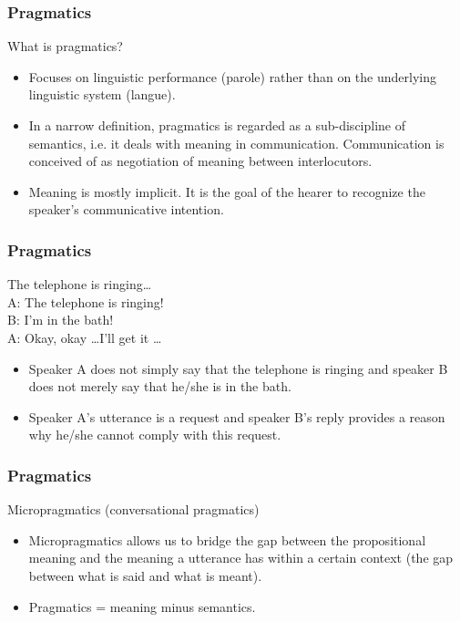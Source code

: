 \documentclass[12pt, table]{beamer}
\begin{document}
\begin{frame}
\frametitle{Pragmatics}
What is pragmatics?
\begin{itemize}
\item Focuses on linguistic performance (parole) rather than on the underlying linguistic system (langue). 
\item In a narrow definition, pragmatics is regarded as a sub-discipline of semantics, i.e. it deals with meaning in communication. Communication is conceived of as negotiation of meaning between interlocutors.  
\item Meaning is mostly implicit. It is the goal of the hearer to recognize the speaker's communicative intention.
\end{itemize}
\end{frame}

\begin{frame}
\frametitle{Pragmatics}
\begin{exe}
\ex The telephone is ringing\dots \\
A: The telephone is ringing!\\
B: I'm in the bath!\\
A: Okay, okay \dots I'll get it \dots
\end{exe}
\begin{itemize}
\item Speaker A does not simply say that the telephone is ringing and speaker B does not merely say that he/she is in the bath. 
\item Speaker A's utterance is a request and speaker B's reply provides a reason why he/she cannot comply with this request.
\end{itemize}
\end{frame}

\begin{frame}
\frametitle{Pragmatics}
Micropragmatics (conversational pragmatics)
\begin{itemize}
\item Micropragmatics allows us to bridge the gap between the propositional meaning and the meaning a utterance has within a certain context (the gap between what is said and what is meant).
\item Pragmatics = meaning minus semantics.
\end{itemize}
\end{frame}
\end{document}
